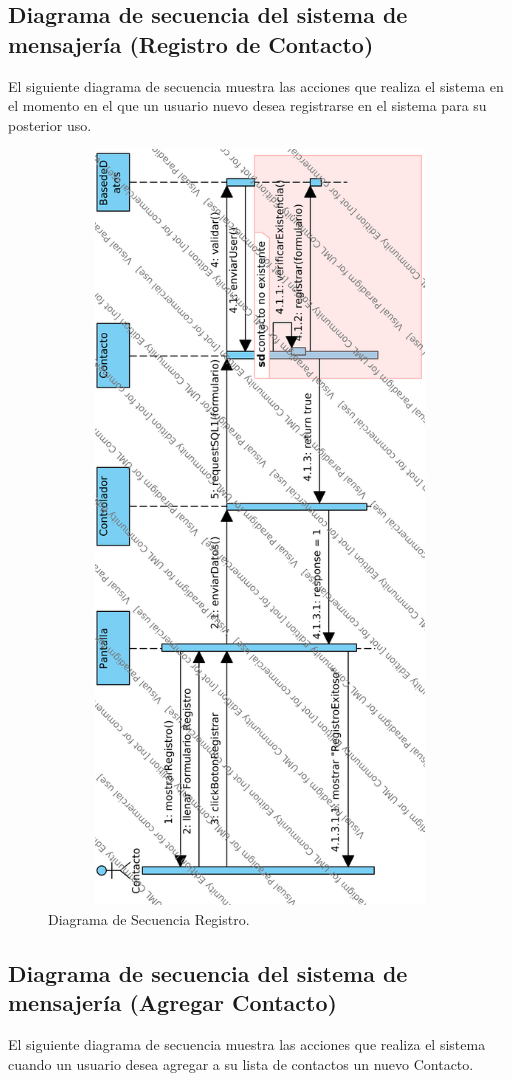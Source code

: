 \subsection{Diagrama de secuencia del sistema de mensajer\'ia (Registro de Contacto)}
El siguiente diagrama de secuencia muestra las acciones que realiza el sistema en el momento en el que un usuario nuevo desea registrarse en el sistema para su posterior uso.
	
	
	\begin{figure}[htbp!]
		\centering
			\includegraphics[width=15cm, height=20cm]{images/Diagramas/SecRegistro}
		\caption{Diagrama de Secuencia Registro.}
	\end{figure}
	\pagebreak
\subsection{Diagrama de secuencia del sistema de mensajer\'ia (Agregar Contacto)}
El siguiente diagrama de secuencia muestra las acciones que realiza el sistema cuando un usuario desea agregar a su lista de contactos un nuevo Contacto.
	
